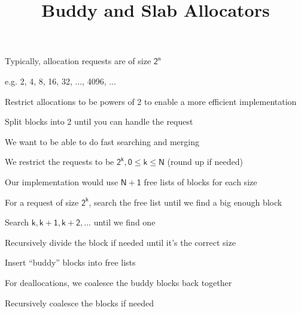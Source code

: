

\title{Buddy and Slab Allocators}



  \begin{frame}
    \titlepage
  \end{frame}

  \begin{slide}


    Typically, allocation requests are of size $\mathsf{2^n}$

    \leftspace{}e.g. 2, 4, 8, 16, 32, ..., 4096, ...
    \medskip

    Restrict allocations to be powers of 2 to enable a more efficient
    implementation

    \leftspace{}Split blocks into 2 until you can handle the request
    \medskip

    We want to be able to do fast searching and merging

  \end{slide}

  \begin{slide}


    We restrict the requests to be $\mathsf{2^k, 0 \leq k \leq N}$ (round up if
    needed)
    \medskip

    Our implementation would use $\mathsf{N+1}$ free lists of blocks for each
    size
    \medskip

    For a request of size $\mathsf{2^k}$, search the free list until we find
    a big enough block

    \leftspace{}Search $\mathsf{k, k+1, k+2, ...}$ until we find one

    \leftspace{}\leftspace{}Recursively divide the block if needed until it's
    the correct size

    \leftspace{}\leftspace{}Insert “buddy” blocks into free lists
    \medskip

    For deallocations, we coalesce the buddy blocks back together

    \leftspace{}Recursively coalesce the blocks if needed

  \end{slide}

